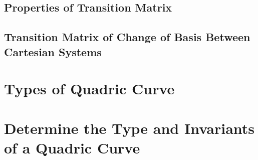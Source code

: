 \documentclass[onecolumn]{ctexart}
\begin{document}
\subsection{Properties of Transition Matrix}

\subsection{Transition Matrix of Change of Basis Between Cartesian Systems}

\section{Types of Quadric Curve}

\section{Determine the Type and Invariants of a Quadric Curve}
\end{document}
